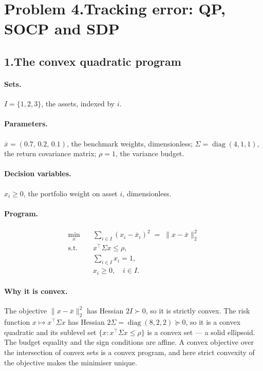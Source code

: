\documentclass[11pt]{article}
\DeclareMathOperator*{\minimize}{min}
\newcommand{\T}{^{\!\top}}
\theoremstyle{definition}
\begin{document}
\section*{Problem 4.\quad Tracking error: QP, SOCP and SDP \quad[30 pts]}

\subsection*{1.\quad The convex quadratic program}

\paragraph{Sets.} $I = \{1,2,3\}$, the assets, indexed by $i$.

\paragraph{Parameters.} $\bar{x} = (0.7,\,0.2,\,0.1)$, the benchmark
weights, dimensionless; $\Sigma = \operatorname{diag}(4,1,1)$, the
return covariance matrix; $\rho = 1$, the variance budget.

\paragraph{Decision variables.} $x_i \ge 0$, the portfolio weight on
asset $i$, dimensionless.

\paragraph{Program.}
\begin{equation}\label{eq:p4qp}
\begin{aligned}
  \minimize_{x}\quad & \sum_{i \in I}(x_i - \bar{x}_i)^2
    \;=\; \|x - \bar{x}\|_2^2\\
  \text{s.t.}\quad & x\T \Sigma x \le \rho,\\
    & \sum_{i \in I} x_i = 1,\\
    & x_i \ge 0, \quad i \in I .
\end{aligned}
\end{equation}

\paragraph{Why it is convex.} The objective
$\|x-\bar{x}\|_2^2$ has Hessian $2I \succ 0$, so it is strictly convex.
The risk function $x \mapsto x\T\Sigma x$ has Hessian
$2\Sigma = \operatorname{diag}(8,2,2) \succeq 0$, so it is a convex
quadratic and its sublevel set $\{x : x\T\Sigma x \le \rho\}$ is a
convex set --- a solid ellipsoid. The budget equality and the sign
conditions are affine. A convex objective over the intersection of
convex sets is a convex program, and here strict convexity of the
objective makes the minimiser unique.
\end{document}
